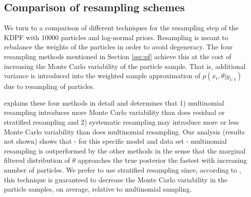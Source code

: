 \documentclass[useAMS,referee,usenatbib]{biom}
\begin{document}
\subsection{Comparison of resampling schemes}

We turn to a comparison of different techniques for the resampling step of the KDPF with 10000 particles and log-normal priors.  Resampling is meant to rebalance the weights of the particles in order to avoid degeneracy.  The four resampling methods mentioned in Section  \ref{sec:pf} achieve this at the cost of increasing the Monte Carlo variability of the particle sample.  That is, additional variance is introduced into the weighted sample approximation of $p(x_t,\theta|y_{1:t})$ due to resampling of particles.

\citet{Douc:Capp:Moul:comp:2005} explains these four methods in detail and determines that 1) multinomial resampling introduces more Monte Carlo variability than does residual or stratified resampling and 2) systematic resampling may introduce more or less Monte Carlo variability than does multinomial resampling. Our analysis (results not shown) shows that - for this specific model and data set - multinomial resampling is outperformed by the other methods in the sense that the marginal filtered distribution of $\theta$ approaches the true posterior the fastest with increasing number of particles. We prefer to use stratified resampling since, according to \cite{Douc:Capp:Moul:comp:2005}, this technique is guaranteed to decrease the Monte Carlo variability in the particle samples, on average, relative to multinomial sampling.


\end{document}
